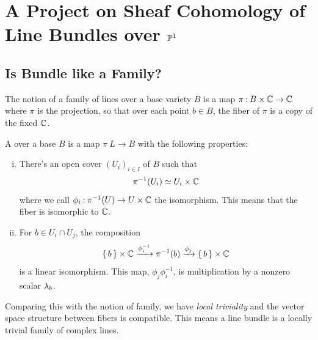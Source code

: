 \documentclass[12pt]{memoir}
\begin{document}
\chapter{A Project on Sheaf Cohomology of Line Bundles over $\mathbb{P}^1$}

\section{Is Bundle like a Family?}

The notion of a family of lines over a base variety $B$ is a map $\pi\mathbin{:} B\times\mathbb{C}\to\mathbb{C}$ where $\pi$ is the projection, so that over each point $b\in B$, the fiber of $\pi$ is a copy of the fixed $\mathbb{C}$. 

\begin{Def}
    A  over a base $B$ is a map $\pi\: L\to B$ with the following properties:
    \begin{enumerate}[i)]
        \item There's an open cover $(U_i)_{i\in I}$ of $B$ such that 
        $$\pi^{-1}(U_i)\simeq U_i\times\mathbb{C}$$
        where we call $\phi_i\mathbin{:}\pi^{-1}(U)\to U\times\mathbb{C}$ the isomorphism. This means that the fiber is isomorphic to $\mathbb{C}$.
        \item For $b\in U_i\cap U_j$, the composition
        $$\{\,b\,\}\times\mathbb{C}\xrightarrow[]{\phi_i^{-1}}\pi^{-1}(b)\xrightarrow[]{\phi_j}\{\,b\,\}\times\mathbb{C}$$
        is a linear isomorphism. This map, $\phi_j\phi_i^{-1}$, is multiplication by a nonzero scalar $\lambda_b$.
    \end{enumerate}
\end{Def}

Comparing this with the notion of family, we have \emph{local triviality} and the vector space structure between fibers is compatible. This means a line bundle is a locally trivial family of complex lines. 
\end{document}

